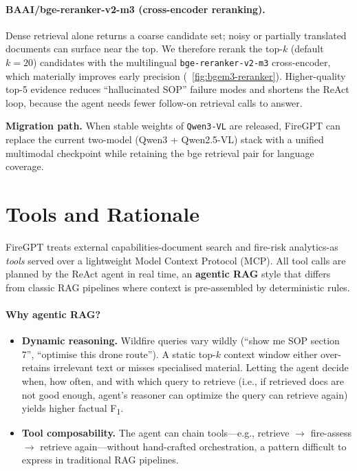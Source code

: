 \documentclass[lang=english,inputenc=utf8,fontsize=10pt]{ldvarticle}
\begin{document}
\paragraph{BAAI/bge-reranker-v2-m3 (cross-encoder reranking).}
Dense retrieval alone returns a coarse candidate set; noisy or partially
translated documents can surface near the top. We therefore rerank the
top-$k$ (default $k=20$) candidates with the multilingual
\texttt{bge-reranker-v2-m3} cross-encoder, which materially improves early
precision (~\cref{fig:bgem3-reranker}). Higher-quality top-5 evidence
reduces ``hallucinated SOP'' failure modes and shortens the ReAct loop,
because the agent needs fewer follow-on retrieval calls to answer.

\bigskip
\noindent\textbf{Migration path.}
When stable weights of \texttt{Qwen3-VL} are released,
FireGPT can replace the current two-model (Qwen3 + Qwen2.5-VL) stack with
a unified multimodal checkpoint while retaining the bge retrieval pair for
language coverage.



\section*{Tools and Rationale}
FireGPT treats external capabilities-document search and fire-risk analytics-as
\emph{tools} served over a lightweight Model Context Protocol (MCP). All tool
calls are planned by the ReAct agent in real time, an \textbf{agentic RAG} style
that differs from classic RAG pipelines where context is pre-assembled by deterministic rules.

\paragraph{Why agentic RAG?}
\vspace{-0.2\baselineskip}
\begin{itemize}
  \item \textbf{Dynamic reasoning.}  Wildfire queries vary wildly
        (``show me SOP section 7'', ``optimise this drone route'').  A
        static top-$k$ context window either over-retains irrelevant text
        or misses specialised material.  Letting the agent decide when, how often,
        and with which query to retrieve (i.e., if retrieved docs are not good enough, 
         agent's reasoner can optimize the query can retrieve again)
         yields higher factual F\textsubscript{1}.
  \item \textbf{Tool composability.}  The agent can chain tools—e.g.,
        retrieve $\rightarrow$ fire-assess $\rightarrow$ retrieve
        again—without hand-crafted orchestration, a pattern difficult to
        express in traditional RAG pipelines.
\end{itemize}
\end{document}
